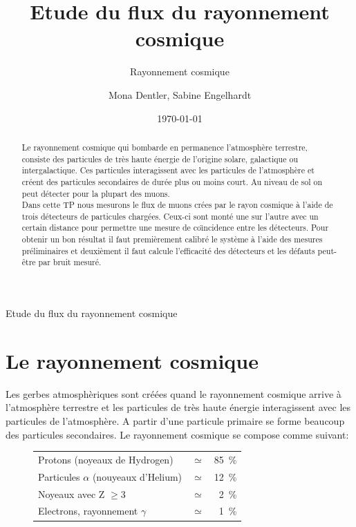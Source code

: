 \documentclass[a4paper,11pt,liststotocnumbered,bibtotocnumbered]{scrartcl}
\title{Etude du flux du rayonnement cosmique}
\subtitle{Rayonnement cosmique}
\author{Mona Dentler, Sabine Engelhardt}
\date{\today}
\begin{document}
 \nocite{poly}
 \pagestyle{empty}
 \begin{center}
  \makeatletter
  \@subject
  \vspace{2cm}

  \Huge
  Etude du flux du rayonnement cosmique\newline
  \vspace{1cm}
  \Large


  \@author
  \newline
  \@publishers


  \@date
  \makeatother
 \end{center}
 \vfill

 \begin{abstract}
  Le rayonnement cosmique qui bombarde en permanence l'atmosphère terrestre, consiste des particules de très haute énergie de l'origine solare, galactique ou intergalactique. Ces particules interagissent avec les particules de l'atmosphère et créent des particules secondaires de durée plus ou moins court. Au niveau de sol on peut détecter pour la plupart des muons.\\
  Dans cette TP nous mesurons le flux de muons crées par le rayon cosmique à l'aide de trois détecteurs de particules chargées. Ceux-ci sont monté une sur l'autre avec un certain distance pour permettre une mesure de co\"{\i}ncidence entre les détecteurs. Pour obtenir un bon résultat il faut premièrement calibré le système à l'aide des mesures préliminaires et deuxièment il faut calcule l'efficacité des détecteurs et les défauts peut-être par bruit mesuré.
 \end{abstract}
\newpage
 \pagestyle{scrheadings}
 \tableofcontents
\newpage

 \section{Le rayonnement cosmique}
  Les gerbes atmosphèriques sont créées quand le rayonnement cosmique arrive à l'atmosphère terrestre et les particules de très haute énergie interagissent avec les particules de l'atmosphère. A partir d'une particule primaire se forme beaucoup des particules secondaires. Le rayonnement cosmique se compose comme suivant:
   \begin{figure}[htb]
    \centering
    \begin{tabular}{lcr}
     Protons (noyeaux de Hydrogen) & $\simeq$ & 85~\%\\
     Particules $\alpha$ (nouyeaux d'Helium) & $\simeq$ & 12~\%\\
     Noyeaux avec Z $\geq 3$	& $\simeq$ & 2~\%\\ 
     Electrons, rayonnement $\gamma$	& $\simeq$ & 1~\%\\
    \end{tabular}\cite[S. 14]{burak}
   \end{figure}	
\end{document}
